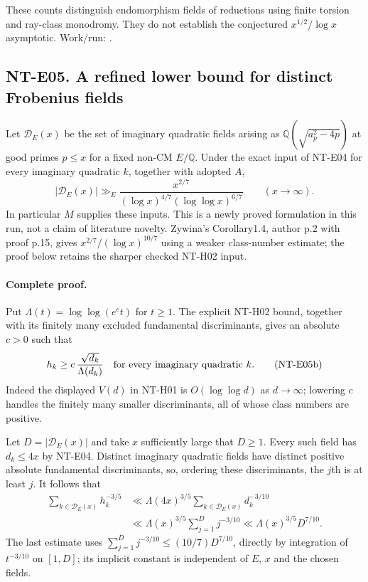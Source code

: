 \documentclass[11pt,a4paper]{article}
\begin{document}
These counts distinguish endomorphism fields of reductions using
finite torsion and ray-class monodromy. They do not establish the
conjectured $x^{1/2}/\log x$ asymptotic. Work/run:
.

\subsection*{NT-E05. A refined lower bound for distinct Frobenius fields}
Let $\mathcal D_E(x)$ be the set of imaginary quadratic fields
arising as $\mathbb Q(\sqrt{a_p^2-4p})$ at good primes $p\le x$
for a fixed non-CM $E/\mathbb Q$. Under the exact input of NT-E04
for every imaginary quadratic $k$, together with adopted $A$,
\[
 |\mathcal D_E(x)|\gg_E
 \frac{x^{2/7}}
      {(\log x)^{4/7}(\log\log x)^{6/7}}
 \qquad(x\longrightarrow\infty).                         \tag{NT-E05a}
\]
In particular $M$ supplies these inputs. This is a newly proved
formulation in this run, not a claim of literature novelty.
Zywina's Corollary1.4, author p.2 with proof p.15, gives
$x^{2/7}/(\log x)^{10/7}$ using a weaker class-number estimate;
the proof below retains the sharper checked NT-H02 input.

\paragraph{Complete proof.}
Put $\Lambda(t)=\log\log(e^e t)$ for $t\ge1$. The explicit
NT-H02 bound, together with its finitely many excluded fundamental
discriminants, gives an absolute $c>0$ such that
\[
 h_k\ge c\,\frac{\sqrt{d_k}}{\Lambda(d_k)}
 \quad\hbox{for every imaginary quadratic }k.             \tag{NT-E05b}
\]
Indeed the displayed $V(d)$ in NT-H01 is $O(\log\log d)$ as
$d\to\infty$; lowering $c$ handles the finitely many smaller
discriminants, all of whose class numbers are positive.

Let $D=|\mathcal D_E(x)|$ and take $x$ sufficiently large that
$D\ge1$. Every such field has $d_k\le4x$ by NT-E04. Distinct
imaginary quadratic fields have distinct positive absolute
fundamental discriminants, so, ordering these discriminants,
the $j$th is at least $j$. It follows that
\begin{align*}
 \sum_{k\in\mathcal D_E(x)}h_k^{-3/5}
 &\ll \Lambda(4x)^{3/5}
                \sum_{k\in\mathcal D_E(x)}d_k^{-3/10}\\
 &\ll \Lambda(x)^{3/5}\sum_{j=1}^D j^{-3/10}
 \ll \Lambda(x)^{3/5}D^{7/10}.
\end{align*}
The last estimate uses
$\sum_{j=1}^D j^{-3/10}\le(10/7)D^{7/10}$, directly by integration of
$t^{-3/10}$ on $[1,D]$; its implicit constant is independent of
$E$, $x$ and the chosen fields.
\end{document}
